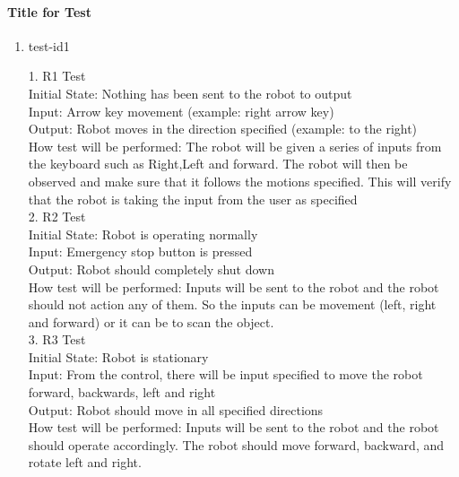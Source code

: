 \documentclass[12pt, titlepage]{article}
\begin{document}
		
\paragraph{Title for Test}

\begin{enumerate}

\item{test-id1\\}

1.	R1 Test \\
Initial State: Nothing has been sent to the robot to output \\
Input: Arrow key movement (example: right arrow key) \\ 
Output: Robot moves in the direction specified (example: to the right) \\ 
How test will be performed: The robot will be given a series of inputs from the keyboard such as Right,Left and forward. The robot will then be observed and make sure that it follows the motions specified. This will verify that the robot is taking the input from the user as specified \\
2.	R2 Test \\
Initial State: Robot is operating normally \\ 
Input: Emergency stop button is pressed \\ 
Output: Robot should completely shut down \\
How test will be performed: Inputs will be sent to the robot and the robot should not action any of them. So the inputs can be movement (left, right and forward) or it can be to scan the object.  \\
3.	R3 Test \\
Initial State: Robot is stationary \\
Input: From the control, there will be input specified to move the robot forward, backwards, left and right \\
Output: Robot should move in all specified directions \\
How test will be performed: Inputs will be sent to the robot and the robot should operate accordingly. The robot should move forward, backward, and rotate left and right. \\

\end{enumerate}
\end{document}
